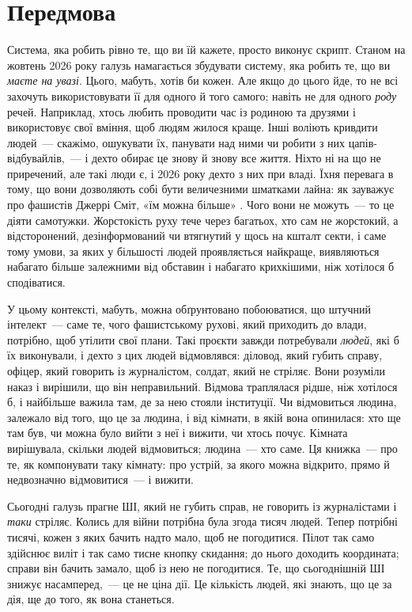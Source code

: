 \chapter*{Передмова}
Система, яка робить рівно те, що ви їй кажете, просто виконує скрипт. Станом на жовтень 2026 року галузь намагається збудувати систему, яка робить те, що ви \emph{маєте на увазі}. Цього, мабуть, хотів би кожен. Але якщо до цього йде, то не всі захочуть використовувати її для одного й того самого; навіть не для одного \emph{роду} речей. Наприклад, хтось любить проводити час із родиною та друзями і використовує свої вміння, щоб людям жилося краще. Інші воліють кривдити людей~— скажімо, ошукувати їх, панувати над ними чи робити з них цапів-відбувайлів,~— і дехто обирає це знову й знову все життя. Ніхто ні на що не приречений, але такі люди є, і 2026 року дехто з них при владі. Їхня перевага в тому, що вони дозволяють собі бути величезними шматками лайна: як зауважує про фашистів Джеррі Сміт, «їм можна більше» \autocite{rickandmorty2023}. Чого вони не можуть~— то це діяти самотужки. Жорстокість руху тече через багатьох, хто сам не жорстокий, а відсторонений, дезінформований чи втягнутий у щось на кшталт секти, і саме тому умови, за яких у більшості людей проявляється найкраще, виявляються набагато більше залежними від обставин і набагато крихкішими, ніж хотілося б сподіватися.

У цьому контексті, мабуть, можна обґрунтовано побоюватися, що штучний інтелект~— саме те, чого фашистському рухові, який приходить до влади, потрібно, щоб утілити свої плани. Такі проєкти завжди потребували \emph{людей}, які б їх виконували, і дехто з цих людей відмовлявся: діловод, який губить справу, офіцер, який говорить із журналістом, солдат, який не стріляє. Вони розуміли наказ і вирішили, що він неправильний. Відмова траплялася рідше, ніж хотілося б, і найбільше важила там, де за нею стояли інституції. Чи відмовиться людина, залежало від того, що це за людина, і від кімнати, в якій вона опинилася: хто ще там був, чи можна було вийти з неї і вижити, чи хтось почує. Кімната вирішувала, скільки людей відмовиться; людина~— хто саме. Ця книжка~— про те, як компонувати таку кімнату: про устрій, за якого можна відкрито, прямо й недвозначно відмовитися~— і вижити.

Сьогодні галузь прагне ШІ, який не губить справ, не говорить із журналістами і \emph{таки} стріляє. Колись для війни потрібна була згода тисяч людей. Тепер потрібні тисячі, кожен з яких бачить надто мало, щоб не погодитися. Пілот так само здійснює виліт і так само тисне кнопку скидання; до нього доходить координата; справи він бачить замало, щоб із нею не погодитися. Те, що сьогоднішній ШІ знижує насамперед,~— це не ціна дії. Це кількість людей, які знають, що це за дія, ще до того, як вона станеться.

